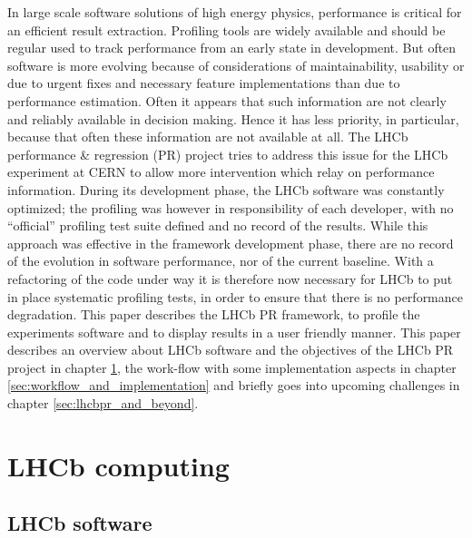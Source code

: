 \documentclass[a4paper]{jpconf}
\begin{document}
In large scale software solutions of high energy physics, performance is critical for an efficient result extraction. Profiling tools are widely available and should be regular used to track performance from an early state in development. But often software is more evolving because of considerations of maintainability, usability or due to urgent fixes and necessary feature implementations than due to performance estimation. Often it appears that such information are not clearly and reliably available in decision making. Hence it has less priority, in particular, because that often these information are not available at all. The LHCb performance \& regression (PR) project tries to address this issue for the LHCb experiment at CERN to allow more intervention which relay on performance information.    
\newline
During its development phase, the LHCb software was constantly optimized; the profiling was however in responsibility of each developer, with no ``official'' profiling test suite defined and no record of the results. While this approach was effective in the framework development phase, there are no record of the evolution in software performance, nor of the current baseline. With a refactoring of the code under way it is therefore now necessary for LHCb to put in place systematic profiling tests, in order to ensure that there is no performance degradation.
\newline
This paper describes the LHCb PR framework, to profile the experiments software and to display results in a user friendly manner. This paper describes an overview about LHCb software and the objectives of the LHCb PR project in chapter \ref{sec:lhcb_computing}, the work-flow with some implementation aspects in chapter \ref{sec:workflow_and_implementation} and briefly goes into upcoming challenges in chapter \ref{sec:lhcbpr_and_beyond}.

\section{LHCb computing}
\label{sec:lhcb_computing}

\subsection{LHCb software}
\label{sec:lhcb_software}
\end{document}
